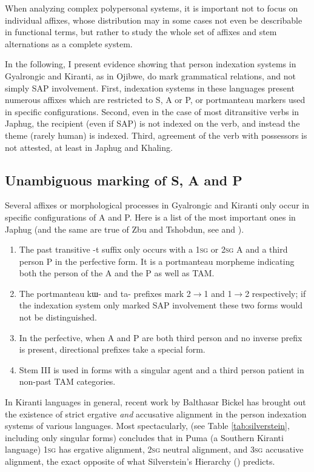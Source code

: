 \documentclass[oldfontcommands,oneside,a4paper,11pt]{article}
\newcommand{\ipa}[1]{{\phon \mbox{#1}}} %
\begin{document}
When analyzing complex polypersonal systems, it is important not to focus on individual affixes, whose distribution may in some cases not even be describable in functional terms, but rather to study the whole set of affixes and stem alternations as a complete system. 

In the following, I present evidence showing that person indexation systems in Gyalrongic and Kiranti, as in Ojibwe, do mark grammatical relations, and not simply SAP involvement. First, indexation systems in these languages present numerous affixes which are restricted to S, A or P, or portmanteau markers used in specific configurations. Second, even in the case of most ditransitive verbs in Japhug, the recipient (even if SAP) is not indexed on the verb, and instead the theme (rarely human) is indexed. Third, agreement of the verb with possessors is not attested, at least in Japhug and Khaling.

\subsection{Unambiguous marking of S, A and P}
Several affixes or morphological processes in Gyalrongic and Kiranti only occur in specific configurations of A and P. Here is a list of the most important ones in Japhug (and the same are true of Zbu and Tshobdun, see \citealt{jackson00sidaba, jackson02rentongdengdi} and \citealt{gongxun14agreement}).

\begin{enumerate}
\item The past transitive \ipa{-t} suffix only occurs with a \textsc{1sg} or \textsc{2sg} A and a third person P in the perfective form. It is a portmanteau morpheme indicating both the person of the A and the P as well as TAM.
\item The portmanteau \ipa{kɯ-} and \ipa{ta-} prefixes mark 2$\rightarrow$1 and 1$\rightarrow$2 respectively; if the indexation system only marked SAP involvement these two forms would not be distinguished.
\item In the perfective, when A and P are both third person and no inverse prefix is present, directional prefixes take a special form.
\item Stem III is used in forms with a singular agent and a third person patient in non-past TAM categories.
\end{enumerate}

In Kiranti languages in general, recent work by Balthasar Bickel has brought out the existence of strict ergative \textit{and} accusative alignment in the person indexation systems of various languages. Most spectacularly, \citet{bickel08scope} (see Table \ref{tab:silverstein}, including only singular forms) concludes that in Puma (a Southern Kiranti language) \textsc{1sg} has ergative alignment, \textsc{2sg} neutral alignment, and \textsc{3sg} accusative alignment, the exact opposite of what Silverstein's Hierarchy (\citealt{silverstein76}) predicts.
\end{document}
